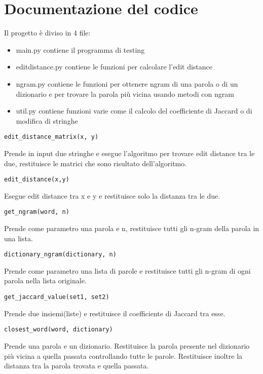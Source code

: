 \documentclass[]{article}
\begin{document}
\section{Documentazione del codice}
Il progetto è diviso in 4 file:
\begin{itemize}
\item main.py contiene il programma di testing
\item editdistance.py contiene le funzioni per calcolare l'edit distance
\item ngram.py contiene le funzioni per ottenere ngram di una parola o di un dizionario e per trovare la parola più vicina usando metodi con ngram
\item util.py contiene funzioni varie come il calcolo del coefficiente di Jaccard o di modifica di stringhe
\end{itemize}
\begin{verbatim}
edit_distance_matrix(x, y)
\end{verbatim}
Prende in input due stringhe e esegue l'algoritmo per trovare edit distance tra le due, restituisce le matrici che sono risultato dell'algoritmo.\\
\begin{verbatim}
edit_distance(x,y)
\end{verbatim}
Esegue edit distance tra x e y e restituisce solo la distanza tra le due.\\
\begin{verbatim}
get_ngram(word, n)
\end{verbatim}
Prende come parametro una parola e n, restituisce tutti gli n-gram della parola in una lista.\\
\begin{verbatim}
dictionary_ngram(dictionary, n)
\end{verbatim}
Prende come parametro una lista di parole e restituisce tutti gli n-gram di ogni parola nella lista originale.\\
\begin{verbatim}
get_jaccard_value(set1, set2)
\end{verbatim}
Prende due insiemi(liste) e restituisce il coefficiente di Jaccard tra esse.\\
\begin{verbatim}
closest_word(word, dictionary)
\end{verbatim}
Prende una parola e un dizionario. Restituisce la parola presente nel dizionario più vicina a quella passata controllando tutte le parole. Restituisce inoltre la distanza tra la parola trovata e quella passata.\\
\end{document}
